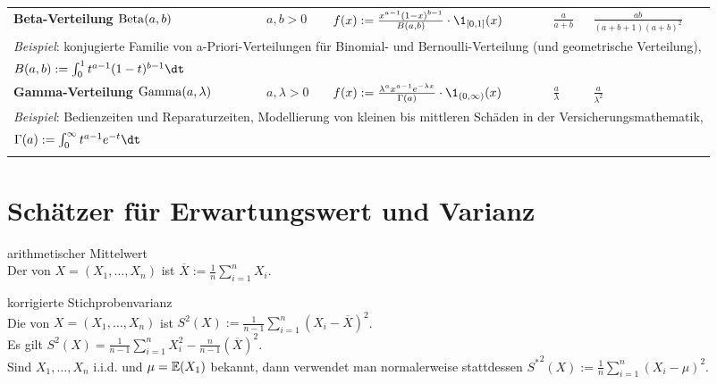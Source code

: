 \begin{landscape}
\begin{tabular}{p{85mm}p{40mm}p{65mm}p{20mm}p{27mm}}
    \addlinespace[5mm]
    \midrule
    \textbf{Beta-Verteilung $\operatorname{Beta}(a, b)$} &
    $a, b > 0$ &
    $f(x) := \frac{x^{a-1} (1-x)^{b-1}}{B(a, b)} \cdot \1_{[0,1]}(x)$ &
    $\frac{a}{a+b}$ &
    $\frac{ab}{(a+b+1)(a+b)^2}$\\
    \multicolumn{5}{l}{\emph{Beispiel}:
    konjugierte Familie von a-Priori-Verteilungen für Binomial- und Bernoulli-Verteilung
    (und geometrische Verteilung),}\\
    \multicolumn{5}{l}{$B(a, b) := \int_0^1 t^{a-1} (1-t)^{b-1} \dt$}\\

    \addlinespace[5mm]
    \midrule
    \textbf{Gamma-Verteilung $\operatorname{Gamma}(a, \lambda)$} &
    $a, \lambda > 0$ &
    $f(x) := \frac{\lambda^a x^{a-1} e^{-\lambda x}}{\Gamma(a)} \cdot \1_{(0,\infty)}(x)$ &
    $\frac{a}{\lambda}$ &
    $\frac{a}{\lambda^2}$\\
    \multicolumn{5}{l}{\emph{Beispiel}:
    Bedienzeiten und Reparaturzeiten, Modellierung von kleinen bis mittleren Schäden in der
    Versicherungsmathematik,}\\
    \multicolumn{5}{l}{$\Gamma(a) := \int_0^\infty t^{a-1} e^{-t}\dt$}\\

    \addlinespace[5mm]
    \bottomrule
\end{tabular}
\end{landscape}

\section{%
    Schätzer für Erwartungswert und Varianz%
}

\begin{Def}{arithmetischer Mittelwert}\\
    Der  von $X = (X_1, \dotsc, X_n)$ ist
    $\overline{X} := \frac{1}{n} \sum_{i=1}^n X_i$.
\end{Def}

\begin{Def}{korrigierte Stichprobenvarianz}\\
    Die  von $X = (X_1, \dotsc, X_n)$ ist
    $S^2(X) := \frac{1}{n-1} \sum_{i=1}^n (X_i - \overline{X})^2$.\\
    Es gilt $S^2(X) = \frac{1}{n-1} \sum_{i=1}^n X_i^2 - \frac{n}{n-1} (\overline{X})^2$.\\
    Sind $X_1, \dotsc, X_n$ i.i.d. und $\mu = \mathbb{E}(X_1)$ bekannt,
    dann verwendet man normalerweise stattdessen
    ${S^\ast}^2(X) := \frac{1}{n} \sum_{i=1}^n (X_i - \mu)^2$.
\end{Def}

